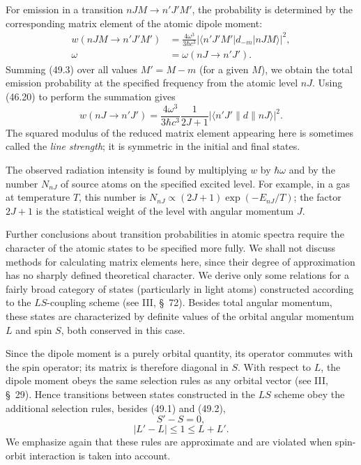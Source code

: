 For emission in a transition $nJM\to n'J'M'$, the probability is determined by the corresponding matrix element of the atomic dipole moment:
\begin{equation}
\begin{aligned}
w(nJM\to n'J'M')&=\frac{4\omega^3}{3\hbar c^3}
|\langle n'J'M'|d_{-m}|nJM\rangle|^2,\\
\omega&=\omega(nJ\to n'J').
\end{aligned}
\tag{49.3}
\end{equation}
Summing (49.3) over all values $M'=M-m$ (for a given $M$), we obtain the total emission probability at the specified frequency from the atomic level $nJ$. Using (46.20) to perform the summation gives
\begin{equation}
w(nJ\to n'J')=\frac{4\omega^3}{3\hbar c^3}\frac1{2J+1}
|\langle n'J'\|d\|nJ\rangle|^2.
\tag{49.4}
\end{equation}
The squared modulus of the reduced matrix element appearing here is sometimes called the \emph{line strength}; it is symmetric in the initial and final states.

The observed radiation intensity is found by multiplying $w$ by $\hbar\omega$ and by the number $N_{nJ}$ of source atoms on the specified excited level. For example, in a gas at temperature $T$, this number is $N_{nJ}\propto(2J+1)\exp(-E_{nJ}/T)$; the factor $2J+1$ is the statistical weight of the level with angular momentum $J$.

Further conclusions about transition probabilities in atomic spectra require the character of the atomic states to be specified more fully. We shall not discuss methods for calculating matrix elements here, since their degree of approximation has no sharply defined theoretical character. We derive only some relations for a fairly broad category of states (particularly in light atoms) constructed according to the $LS$-coupling scheme (see III, \S~72). Besides total angular momentum, these states are characterized by definite values of the orbital angular momentum $L$ and spin $S$, both conserved in this case.

Since the dipole moment is a purely orbital quantity, its operator commutes with the spin operator; its matrix is therefore diagonal in $S$. With respect to $L$, the dipole moment obeys the same selection rules as any orbital vector (see III, \S~29). Hence transitions between states constructed in the $LS$ scheme obey the additional selection rules, besides (49.1) and (49.2),
\begin{equation}
S'-S=0,
\tag{49.5}
\end{equation}
\begin{equation}
|L'-L|\leq1\leq L+L'.
\tag{49.6}
\end{equation}
We emphasize again that these rules are approximate and are violated when spin-orbit interaction is taken into account.

